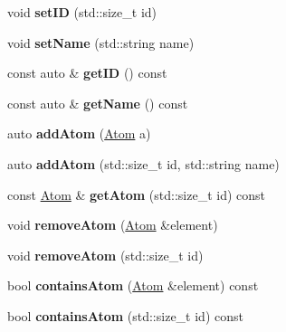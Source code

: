 \begin{DoxyCompactItemize}
\item 
\mbox{\label{classMolecule_a4940ffb3d3e6c935e3fc2bccbf7107d3}} 
void {\bfseries set\+ID} (std\+::size\+\_\+t id)
\item 
\mbox{\label{classMolecule_a77d5303c4ff048502b73adba7207ed79}} 
void {\bfseries set\+Name} (std\+::string name)
\item 
\mbox{\label{classMolecule_af4313873dda8ed9eee321c43fee310a6}} 
const auto \& {\bfseries get\+ID} () const
\item 
\mbox{\label{classMolecule_abb3cefe3898d802d6684ad47993dd159}} 
const auto \& {\bfseries get\+Name} () const
\item 
\mbox{\label{classMolecule_a2fe20ffab84ba21ddf9c7f489a52b4e6}} 
auto {\bfseries add\+Atom} (\mbox{\hyperlink{structAtom}{Atom}} a)
\item 
\mbox{\label{classMolecule_a5961760d11096237c00c6463097c357d}} 
auto {\bfseries add\+Atom} (std\+::size\+\_\+t id, std\+::string name)
\item 
\mbox{\label{classMolecule_a3e6f6cc7048d35137a581d7fe703d040}} 
const \mbox{\hyperlink{structAtom}{Atom}} \& {\bfseries get\+Atom} (std\+::size\+\_\+t id) const
\item 
\mbox{\label{classMolecule_a1570c9668e3c060090831a64bc516f1d}} 
void {\bfseries remove\+Atom} (\mbox{\hyperlink{structAtom}{Atom}} \&element)
\item 
\mbox{\label{classMolecule_a5825adf80b9339a13fec9c61bcc37c8f}} 
void {\bfseries remove\+Atom} (std\+::size\+\_\+t id)
\item 
\mbox{\label{classMolecule_a3d5c5e4e5e5661c6ae101e8677daf5a2}} 
bool {\bfseries contains\+Atom} (\mbox{\hyperlink{structAtom}{Atom}} \&element) const
\item 
\mbox{\label{classMolecule_a6f27921b5f6c57099a5012ceb4c59ba5}} 
bool {\bfseries contains\+Atom} (std\+::size\+\_\+t id) const

\end{DoxyCompactItemize}
